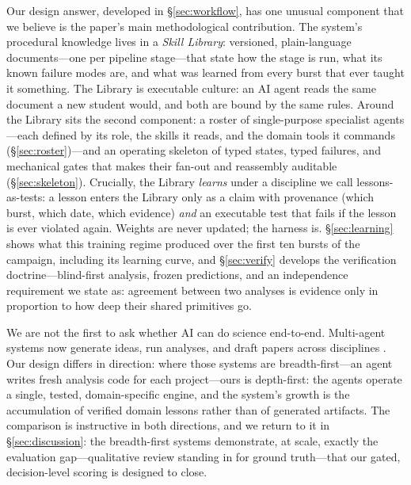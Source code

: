 \documentclass[twocolumn]{aastex631}
\begin{document}
Our design answer, developed in \S\ref{sec:workflow}, has one unusual
component that we believe is the paper's main methodological contribution.
The system's procedural knowledge lives in a \emph{Skill Library}: versioned,
plain-language documents---one per pipeline stage---that state how the stage
is run, what its known failure modes are, and what was learned from every
burst that ever taught it something. The Library is executable culture: an
AI agent reads the same document a new student would, and both are bound by
the same rules. Around the Library sits the second component: a roster of
single-purpose specialist agents---each defined by its role, the skills it
reads, and the domain tools it commands (\S\ref{sec:roster})---and an
operating skeleton of typed states, typed failures, and mechanical gates
that makes their fan-out and reassembly auditable (\S\ref{sec:skeleton}).
Crucially, the Library \emph{learns} under a discipline we
call lessons-as-tests: a lesson enters the Library only as a claim with
provenance (which burst, which date, which evidence) \emph{and} an
executable test that fails if the lesson is ever violated again. Weights
are never updated; the harness is. \S\ref{sec:learning} shows what this
training regime produced over the first ten bursts of the campaign,
including its learning curve, and \S\ref{sec:verify} develops the
verification doctrine---blind-first analysis, frozen predictions, and an
independence requirement we state as: agreement between two analyses is
evidence only in proportion to how deep their shared primitives go.

We are not the first to ask whether AI can do science end-to-end.
Multi-agent systems now generate ideas, run analyses, and draft papers
across disciplines \citep{2025arXiv251026887V,2025arXiv250408066Y}. Our design differs in direction: where those
systems are breadth-first---an agent writes fresh analysis code for each
project---ours is depth-first: the agents operate a single, tested,
domain-specific engine, and the system's growth is the accumulation of
verified domain lessons rather than of generated artifacts. The comparison
is instructive in both directions, and we return to it in
\S\ref{sec:discussion}: the breadth-first systems demonstrate, at scale,
exactly the evaluation gap---qualitative review standing in for ground
truth---that our gated, decision-level scoring is designed to close.
\end{document}
